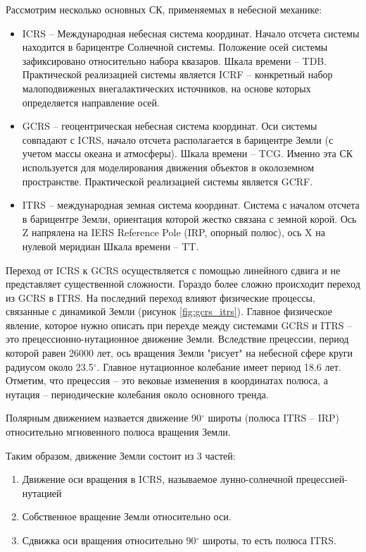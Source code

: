Рассмотрим несколько основных СК, применяемых в небесной механике:
\begin{itemize}
    \item ICRS -- Международная небесная система координат. Начало отсчета системы находится
    в барицентре Солнечной системы. Положение осей системы зафиксировано относительно набора
    квазаров. Шкала времени -- TDB. Практической реализацией системы является ICRF -- конкретный набор
    малоподвиженых внегалактических источников, на основе которых определяется направление осей.
    \item GCRS -- геоцентрическая небесная система координат.
    Оси системы совпадают с ICRS, 
    начало отсчета располагается в барицентре Земли (с учетом массы океана и атмосферы).
    Шкала времени -- TCG. 
    Именно эта СК используется
    для моделирования движения объектов в околоземном пространстве.
    Практической реализацией системы является GCRF.
    \item ITRS -- международная земная система координат. Система с началом отсчета в барицентре Земли, ориентация которой
    жестко связана с земной корой. Ось Z напрялена на IERS Reference Pole (IRP, опорный полюс), ось X на нулевой меридиан Шкала времени -- TT. 
\end{itemize}

Переход от ICRS к GCRS осуществляется с помощью линейного сдвига и не представляет
существенной сложности. Гораздо более сложно происходит переход из GCRS в ITRS.
На последний переход влияют физические процессы, связанные с динамикой Земли
(рисунок \ref{fig:gcrs_itrs}).
Главное физическое явление, которое нужно описать при перехде между системами GCRS и
ITRS -- это прецессионно-нутационное движение Земли. Вследствие прецессии, период которой
равен 26000 лет, ось вращения Земли "рисует" на небесной сфере круги радиусом
около 23.5$^\circ$. Главное нутационное колебание имеет период 18.6 лет.
Отметим, что прецессия -- это вековые изменения в координатах полюса, 
а нутация -- периодические колебания около основного тренда.

Полярным движением назвается движение 90$^\circ$ широты (полюса ITRS -- IRP)
относительно мгновенного полюса вращения Земли.

Таким образом, движение Земли состоит из 3 частей:
\begin{enumerate}
    \item Движение оси вращения в ICRS, называемое лунно-солнечной прецессией-нутацией
    \item Собственное вращение Земли относительно оси.
    \item Сдвижка оси вращения относительно 90$^\circ$ широты, то есть полюса ITRS.
\end{enumerate}

